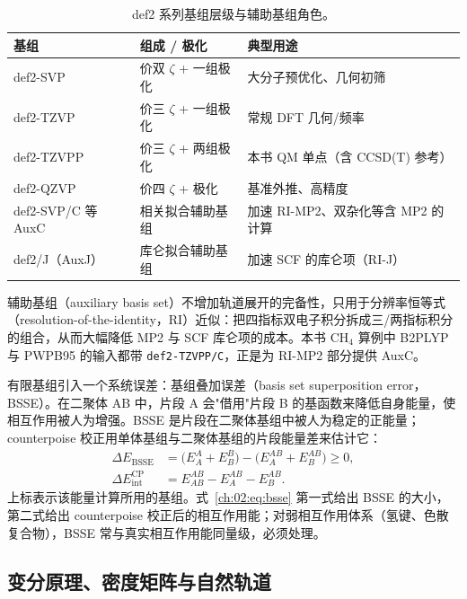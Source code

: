 \begin{table}[t]
\centering
\small
\caption{def2 系列基组层级与辅助基组角色。}\label{ch:02:tab:basis}
\begin{tabular}{@{}lp{4.2cm}p{5.4cm}@{}}
\toprule
基组 & 组成 / 极化 & 典型用途 \\
\midrule
def2-SVP & 价双 $\zeta$ + 一组极化 & 大分子预优化、几何初筛 \\
def2-TZVP & 价三 $\zeta$ + 一组极化 & 常规 DFT 几何/频率 \\
def2-TZVPP & 价三 $\zeta$ + 两组极化 & 本书 QM 单点（含 CCSD(T) 参考） \\
def2-QZVP & 价四 $\zeta$ + 极化 & 基准外推、高精度 \\
def2-SVP/C 等 AuxC & 相关拟合辅助基组 & 加速 RI-MP2、双杂化等含 MP2 的计算 \\
def2/J（AuxJ） & 库仑拟合辅助基组 & 加速 SCF 的库仑项（RI-J） \\
\bottomrule
\end{tabular}
\end{table}

辅助基组（auxiliary basis set）不增加轨道展开的完备性，只用于分辨率恒等式（resolution-of-the-identity，RI）近似：把四指标双电子积分拆成三/两指标积分的组合，从而大幅降低 MP2 与 SCF 库仑项的成本\citep{weigend2006aux,hellweg2007aux}。本书 CH$_4$ 算例中 B2PLYP 与 PWPB95 的输入都带 \texttt{def2-TZVPP/C}，正是为 RI-MP2 部分提供 AuxC。

有限基组引入一个系统误差：基组叠加误差（basis set superposition error，BSSE）。在二聚体 AB 中，片段 A 会"借用"片段 B 的基函数来降低自身能量，使相互作用被人为增强。BSSE 是片段在二聚体基组中被人为稳定的正能量；counterpoise 校正用单体基组与二聚体基组的片段能量差来估计它：\begin{equation}
\begin{aligned}
\Delta E_{\mathrm{BSSE}}
&= \big(E_A^{A}+E_B^{B}\big)-\big(E_A^{AB}+E_B^{AB}\big)\ge 0,\\
\Delta E_{\mathrm{int}}^{\mathrm{CP}}
&= E_{AB}^{AB}-E_A^{AB}-E_B^{AB}.
\end{aligned}
\label{ch:02:eq:bsse}
\end{equation}
上标表示该能量计算所用的基组。式~\eqref{ch:02:eq:bsse} 第一式给出 BSSE 的大小，第二式给出 counterpoise 校正后的相互作用能；对弱相互作用体系（氢键、色散复合物），BSSE 常与真实相互作用能同量级，必须处理。

\subsection{变分原理、密度矩阵与自然轨道}
\label{ch:02:sec:variational}

